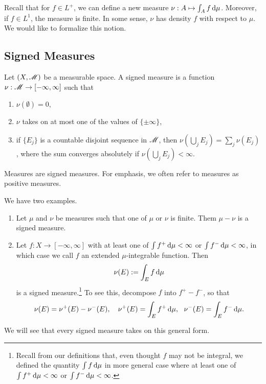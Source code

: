 \documentclass[12pt]{article} %
\begin{document}
Recall that for $f \in L^+$, we can define a new measure $\nu : A \mapsto \int_A f \, \mathrm{d} \mu$. Moreover, if $f \in L^1$, the measure is finite. In some sense, $\nu$ has density $f$ with respect to $\mu$. We would like to formalize this notion. 

\subsection{Signed Measures}

\begin{definition}
    Let $(X, \mathscr{M})$ be a measurable space. A signed measure is a function $\nu : \mathscr{M} \to [-\infty, \infty]$ such that \begin{enumerate}
        \item $\nu(\emptyset) = 0$,
        \item $\nu$ takes on at most one of the values of $\{\pm \infty\}$,
        \item if $\{E_j\}$ is a countable disjoint sequence in $\mathscr{M}$, then $\nu(\bigcup_j E_j) = \sum_j \nu(E_j)$, where the sum converges absolutely if $\nu(\bigcup_j E_j) < \infty$.
    \end{enumerate}
\end{definition}

\begin{remark}
    Measures are signed measures. For emphasis, we often refer to measures as positive measures.
\end{remark}

\begin{example}
    We have two examples.
    \begin{enumerate}
        \item Let $\mu$ and $\nu$ be measures such that one of $\mu$ or $\nu$ is finite. Them $\mu - \nu$ is a signed measure.
        \item Let $f : X \to [-\infty,\infty]$ with at least one of $\int f^+ \, \mathrm{d} \mu < \infty$ or $\int f^- \, \mathrm{d} \mu < \infty$, in which case we call $f$ an extended $\mu$-integrable function. Then \[\nu(E) := \int_E f \, \mathrm{d} \mu\] is a signed measure.\footnote{Recall from our definitions that, even thought $f$ may not be integral, we defined the quantity $\int f \, \mathrm{d}\mu$ in more general case where at least one of $\int f^+ \, \mathrm{d} \mu < \infty$ or $\int f^- \, \mathrm{d} \mu < \infty$.} To see this, decompose $f$ into $f^+ - f^-$, so that \[\nu(E) = \nu^+(E) - \nu^{-}(E), \ \ \ \nu^+(E) = \int_E f^+\d\mu, \ \ \nu^{-}(E) = \int_E f^- \d \mu.\] 
    \end{enumerate}
    We will see that every signed measure takes on this general form.
\end{example}
 
\end{document}
